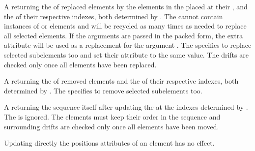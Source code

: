 \documentclass[letterpaper,10pt,english]{sphinxmanual}
\begin{document}
\begin{description}
\sphinxAtStartPar
A   returning the  of replaced elements by the elements in the   placed at their {\hyperref[\detokenize{sequences:element-positions}]{}}, and the
 of their respective indexes, both determined by . The   cannot contain instances of  or 
elements and will be recycled as many times as needed to replace all selected elements. If the arguments are passed in the packed form, the extra attribute
 will be used as a replacement for the argument . The   specifies to replace selected sub\sphinxhyphen{}elements too and set
their  attribute to the same value. The  drifts are checked only once all elements have been replaced.

\sphinxAtStartPar
A  \sphinxcode{\sphinxupquote{({[}rng{]}, {[}sel{]})}} returning the  of removed elements and the  of their respective indexes, both determined by .
The   specifies to remove selected sub\sphinxhyphen{}elements too.

\sphinxAtStartPar
A  \sphinxcode{\sphinxupquote{({[}rng{]}, {[}sel{]})}} returning the sequence itself after updating the {\hyperref[\detokenize{sequences:element-positions}]{}} at the indexes determined by .
The   is ignored. The elements must keep their order in the sequence and surrounding  drifts are checked only once all elements
have been moved. %
\begin{footnote}[3]\sphinxAtStartFootnote
Updating directly the positions attributes of an element has no effect.
%
\end{footnote}


\end{description}
\end{document}
